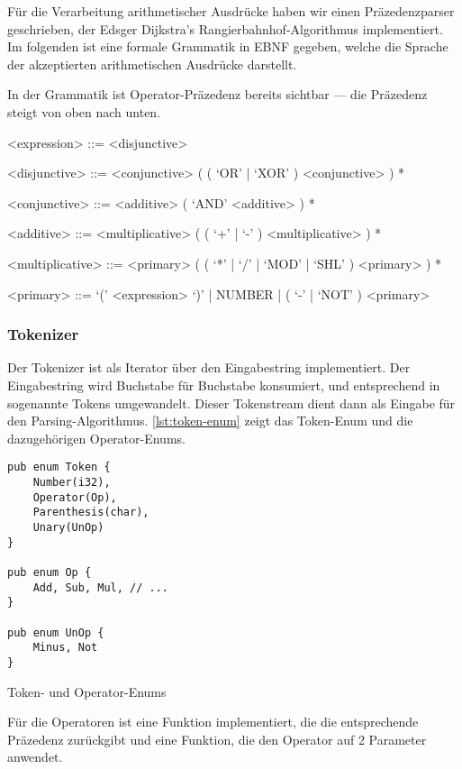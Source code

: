 Für die Verarbeitung arithmetischer Ausdrücke haben wir einen Präzedenzparser geschrieben, der Edsger Dijkstra's Rangierbahnhof-Algorithmus implementiert. Im folgenden ist eine formale Grammatik in \ac{EBNF} gegeben, welche die Sprache der akzeptierten arithmetischen Ausdrücke darstellt.

In der Grammatik ist Operator-Präzedenz bereits sichtbar --- die Präzedenz steigt von oben nach unten.

\begin{grammar}

<expression> ::= <disjunctive>

<disjunctive> ::= <conjunctive> ( ( `OR' | `XOR' ) <conjunctive> ) *

<conjunctive> ::= <additive> ( `AND' <additive> ) *

<additive> ::= <multiplicative> ( ( `+' | `-' ) <multiplicative> ) *

<multiplicative> ::= <primary> ( ( `*' | `/' | `MOD' | `SHL' ) <primary> ) *

<primary> ::= `(' <expression> `)' | NUMBER | ( `-' | `NOT' ) <primary>

\end{grammar}

\subsubsection{Tokenizer}

Der Tokenizer ist als Iterator über den Eingabestring implementiert. Der Eingabestring wird Buchstabe für Buchstabe konsumiert, und entsprechend in sogenannte Tokens umgewandelt. Dieser Tokenstream dient dann als Eingabe für den Parsing-Algorithmus.
\cref{lst:token-enum} zeigt das Token-Enum und die dazugehörigen Operator-Enums.

\begin{listing}[th]
\begin{verbatim}
pub enum Token {
    Number(i32),
    Operator(Op),
    Parenthesis(char),
    Unary(UnOp)
}

pub enum Op {
    Add, Sub, Mul, // ...
}

pub enum UnOp {
    Minus, Not
}
\end{verbatim}
\label{lst:token-enum}
\caption{Token- und Operator-Enums}
\end{listing}

Für die Operatoren ist eine Funktion implementiert, die die entsprechende Präzedenz zurückgibt und eine Funktion, die den Operator auf 2 Parameter anwendet.

